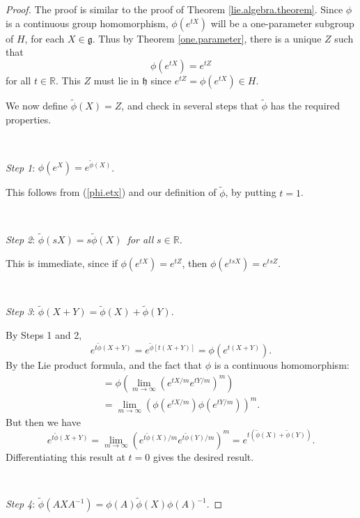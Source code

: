 \documentclass{amsbook}
\let \frak = \mathfrak
\theoremstyle{plain}
\numberwithin{equation}{chapter}
\numberwithin{theorem}{chapter}
\begin{document}
\begin{proof}
The proof is similar to the proof of Theorem \ref{lie.algebra.theorem}. Since
$\phi$ is a continuous group homomorphism, $\phi(e^{tX})$ will be a
one-parameter subgroup of $H$, for each $X\in\frak{g}$. Thus by Theorem
\ref{one.parameter}, there is a unique $Z$ such that
\begin{equation}
\phi\left(  e^{tX}\right)  =e^{tZ}\label{phi.etx}%
\end{equation}
for all $t\in\mathbb{R}$. This $Z$ must lie in $\frak{h}$ since $e^{tZ}%
=\phi\left(  e^{tX}\right)  \in H$.

We now define $\widetilde{\phi}(X)=Z$, and check in several steps that
$\widetilde{\phi}$ has the required properties.

\ 

\textit{Step 1}: $\phi(e^{X})=e^{\widetilde{\phi}(X)}$.

This follows from (\ref{phi.etx}) and our definition of $\widetilde{\phi}$, by
putting $t=1$.

\ 

\textit{Step 2}: $\widetilde{\phi}(sX)=s\widetilde{\phi}(X)$\textit{\ for all
}$s\in\mathbb{R}$.

This is immediate, since if $\phi(e^{tX})=e^{tZ}$, then $\phi(e^{tsX}%
)=e^{tsZ}$.

\ 

\textit{Step 3}: $\widetilde{\phi}(X+Y)=\widetilde{\phi}(X)+\widetilde{\phi
}(Y)$.

By Steps 1 and 2,
\[
e^{t\widetilde{\phi}(X+Y)}=e^{\widetilde{\phi}[t(X+Y)]}=\phi\left(
e^{t(X+Y)}\right)  \text{.}%
\]
By the Lie product formula, and the fact that $\phi$ is a continuous
homomorphism:
\begin{align*}
=\phi\left(  \lim_{m\rightarrow\infty}\left(  e^{tX/m}e^{tY/m}\right)
^{m}\right)  \\
=\lim_{m\rightarrow\infty}\left(  \phi\left(  e^{tX/m}\right)  \phi
(e^{tY/m})\right)  ^{m}\text{.}%
\end{align*}
But then we have
\[
e^{t\widetilde{\phi}(X+Y)}=\lim_{m\rightarrow\infty}\left(  e^{t\widetilde
{\phi}(X)/m}e^{t\widetilde{\phi}(Y)/m}\right)  ^{m}=e^{t\left(  \widetilde
{\phi}(X)+\widetilde{\phi}(Y)\right)  }\text{.}%
\]
Differentiating this result at $t=0$ gives the desired result.

\ \ 

\textit{Step 4}: $\widetilde{\phi}\left(  AXA^{-1}\right)  =\phi
(A)\widetilde{\phi}(X)\phi(A)^{-1}$.


\end{proof}
\end{document}
